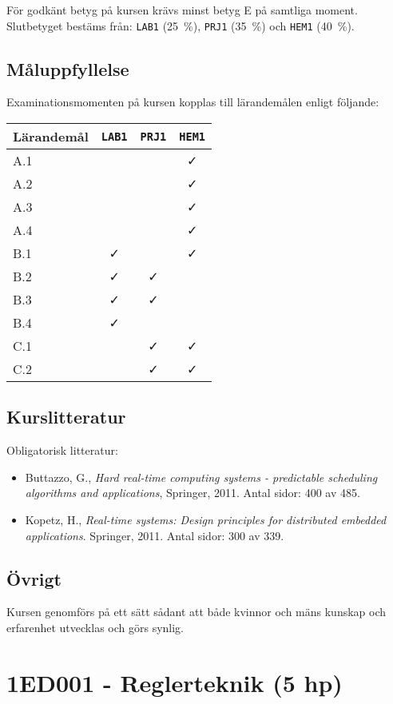 För godkänt betyg på kursen krävs minst betyg E på samtliga moment.
Slutbetyget bestäms från: \texttt{LAB1} (25~\%), \texttt{PRJ1} (35~\%) och \texttt{HEM1} (40~\%).

\subsection*{Måluppfyllelse}

Examinationsmomenten på kursen kopplas till lärandemålen enligt
följande:

\begin{longtable}[]{@{}lccc@{}}
\toprule
\textsf{Lärandemål} & \texttt{LAB1} & \texttt{PRJ1} & \texttt{HEM1}\tabularnewline
\midrule
\endhead
A.1 & & & \faCheck\tabularnewline
A.2 & & & \faCheck\tabularnewline
A.3 & & & \faCheck\tabularnewline
A.4 & & & \faCheck\tabularnewline
B.1 & \faCheck & & \faCheck\tabularnewline
B.2 & \faCheck & \faCheck &\tabularnewline
B.3 & \faCheck & \faCheck &\tabularnewline
B.4 & \faCheck & &\tabularnewline
C.1 & & \faCheck & \faCheck\tabularnewline
C.2 & & \faCheck & \faCheck\tabularnewline
\bottomrule
\end{longtable}

\subsection*{Kurslitteratur}

Obligatorisk litteratur:

\begin{itemize}
\tightlist
\item
  Buttazzo, G., \emph{Hard real-time computing systems - predictable
  scheduling algorithms and applications}, Springer, 2011. Antal sidor:
  400 av 485.
\item
  Kopetz, H., \emph{Real-time systems: Design principles for distributed
  embedded applications}. Springer, 2011. Antal sidor: 300 av 339.
\end{itemize}

\subsection*{Övrigt}

Kursen genomförs på ett sätt sådant att både kvinnor och mäns kunskap och erfarenhet utvecklas och görs synlig.
\pagebreak
\section*{1ED001 - Reglerteknik (5 hp)}

